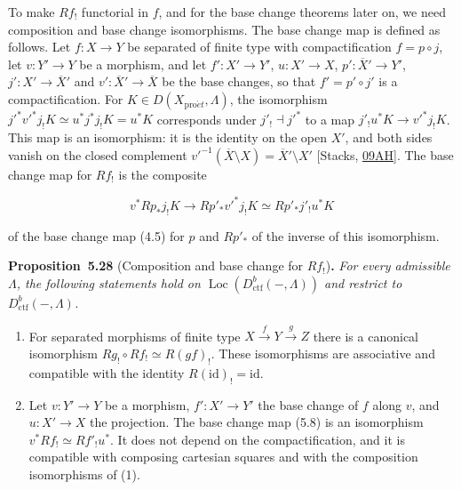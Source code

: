 \documentclass[11pt]{article}
\newenvironment{bpstatement}[2]{\par\addvspace{0.6\baselineskip}\noindent\textbf{#1}#2\textbf{.}\enspace\ignorespaces}
  {\par\addvspace{0.4\baselineskip}}
\newenvironment{bpstatementit}[2]{\begin{bpstatement}{#1}{#2}\itshape\ignorespaces}{\end{bpstatement}}
\providecommand{\Loc}{}\renewcommand{\Loc}{\operatorname{Loc}}
\begin{document}
\label{bp495}%
To make \(Rf_!\) functorial in \(f\), and for the base change theorems later on, we need composition and base change isomorphisms. The base change map is defined as follows. Let \(f:X\to Y\) be separated of finite type with compactification \(f=p\circ j\), let \(v:Y'\to Y\) be a morphism, and let \(f':X'\to Y'\), \(u:X'\to X\), \(p':\overline X'\to Y'\), \(j':X'\to\overline X'\) and \(v':\overline X'\to\overline X\) be the base changes, so that \(f'=p'\circ j'\) is a compactification. For \(K\in D(X_{\mathrm{pro}\acute{e}t},\Lambda)\), the isomorphism \(j'^*v'^*j_!K\simeq u^*j^*j_!K=u^*K\) corresponds under \(j'_!\dashv j'^*\) to a map \(j'_!u^*K\to v'^*j_!K\). This map is an isomorphism: it is the identity on the open \(X'\), and both sides vanish on the closed complement \(v'^{-1}(\overline X\setminus X)=\overline X'\setminus X'\) [Stacks, \href{https://stacks.math.columbia.edu/tag/09AH}{09AH}]. The base change map for \(Rf_!\) is the composite

\[
v^*Rp_*j_!K\longrightarrow Rp'_*v'^*j_!K\simeq Rp'_*j'_!u^*K
\tag{5.8}
\]

of the base change map (4.5) for \(p\) and \(Rp'_*\) of the inverse of this isomorphism.

\label{bp496}%
\begin{bpstatementit}{Proposition~5.28}{ (Composition and base change for $Rf_!$)}
For every admissible \(\Lambda\), the following statements hold on \(\Loc(D^b_{\mathrm{ctf}}(-,\Lambda))\) and restrict to \(D^b_{\mathrm{ctf}}(-,\Lambda)\).

\begin{enumerate}
\item For separated morphisms of finite type \(X\xrightarrow fY
  \xrightarrow gZ\) there is a canonical isomorphism \(Rg_!\circ Rf_!\simeq R(gf)_!\). These isomorphisms are associative and compatible with the identity \(R(\mathrm{id})_!=\mathrm{id}\).
\item Let \(v:Y'\to Y\) be a morphism, \(f':X'\to Y'\) the base change of \(f\) along \(v\), and \(u:X'\to X\) the projection. The base change map (5.8) is an isomorphism \(v^*Rf_!\simeq Rf'_!u^*\). It does not depend on the compactification, and it is compatible with composing cartesian squares and with the composition isomorphisms of (1).
\end{enumerate}
\end{bpstatementit}
\end{document}
